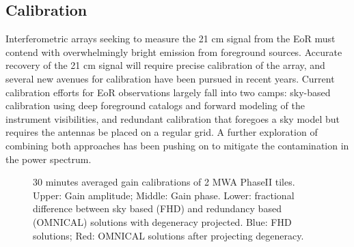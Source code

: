\documentclass[a0,landscape]{a0poster}
\begin{document}
\begin{multicols}{4}
\section*{Calibration}


Interferometric arrays seeking to measure the 21 cm signal from the EoR must contend with overwhelmingly bright emission from foreground sources. Accurate recovery of the 21 cm signal will require precise calibration of the array, and several new avenues for calibration have been pursued in recent years. Current calibration efforts for EoR observations largely fall into two camps:  sky-based calibration using deep foreground catalogs and forward modeling of the instrument visibilities, and redundant calibration that foregoes a sky model but requires the antennas be placed on a regular grid. A further exploration of combining both approaches has been pushing on to mitigate the contamination in the power spectrum.
\begin{figure}[H]
\centering
\label{comparison_between_sky_and_redundant}
\caption{30 minutes averaged gain calibrations of 2 MWA PhaseII tiles. Upper: Gain amplitude; Middle: Gain phase. Lower: fractional difference between sky based (FHD) and redundancy based (OMNICAL) solutions with degeneracy projected. Blue: FHD solutions; Red: OMNICAL solutions after projecting degeneracy.}
\end{figure}



\end{multicols}
\end{document}
